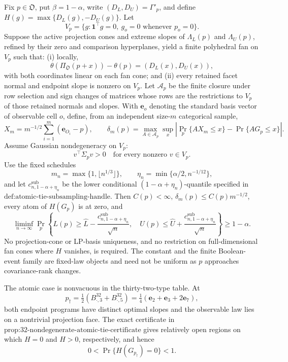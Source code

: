 Fix \(p\in\mathfrak O\), put \(\beta=1-\alpha\), write \((D_L,D_U)=\Gamma'_p\), and define \(H(g)=\max\{D_L(g),-D_U(g)\}\).  Let
\[
V_p=\{g:\mathbf 1^{\top}g=0,\ g_o=0\text{ whenever }p_o=0\}.
\]
Suppose the active projection cones and extreme slopes of \(\Lambda_L(p)\) and \(\Lambda_U(p)\), refined by their zero and comparison hyperplanes, yield a finite polyhedral fan on \(V_p\) such that: (i) locally,
\[
\theta(\Pi_{\mathfrak O}(p+x))-\theta(p)=(D_L(x),D_U(x)),
\]
with both coordinates linear on each fan cone; and (ii) every retained facet normal and endpoint slope is nonzero on \(V_p\).  Let \(\mathcal A_p\) be the finite closure under row selection and sign changes of matrices whose rows are the restrictions to \(V_p\) of those retained normals and slopes.  With \(\mathbf e_o\) denoting the standard basis vector of observable cell \(o\), define, from an independent size-\(m\) categorical sample,
\[
X_m=m^{-1/2}\sum_{i=1}^m(\mathbf e_{O_i}-p),
\qquad
\delta_m(p)=\max_{A\in\mathcal A_p}\sup_x
\left|\Pr_p\{AX_m\leq x\}-\Pr\{AG_p\leq x\}\right|.
\]
Assume Gaussian nondegeneracy on \(V_p\):
\[
v^{\top}\Sigma_pv>0\quad\text{for every nonzero }v\in V_p.
\]
Use the fixed schedules
\[
m_n=\max\{1,\lfloor n^{1/3}\rfloor\},
\qquad
\eta_n=\min\{\alpha/2,n^{-1/12}\},
\]
and let \(c^{\mathrm{sub}}_{n,1-\alpha+\eta_n}\) be the lower conditional \((1-\alpha+\eta_n)\)-quantile specified in \(\text{def:atomic-tie-subsampling-handle}\).  Then \(C(p)<\infty\), \(\delta_m(p)\leq C(p)m^{-1/2}\), every atom of \(H(G_p)\) is at zero, and
\[
\liminf_{n\to\infty}\Pr_p\left\{
L(p)\geq\widehat L-\frac{c^{\mathrm{sub}}_{n,1-\alpha+\eta_n}}{\sqrt n},
\quad
U(p)\leq\widehat U+\frac{c^{\mathrm{sub}}_{n,1-\alpha+\eta_n}}{\sqrt n}
\right\}\geq1-\alpha.
\]
No projection-cone or LP-basis uniqueness, and no restriction on full-dimensional fan cones where \(H\) vanishes, is required.  The constant and the finite Boolean-event family are fixed-law objects and need not be uniform as \(p\) approaches covariance-rank changes.

The atomic case is nonvacuous in the thirty-two-type table.  At
\[
p_\dagger=\tfrac12(B^{32}_{\cdot,3}+B^{32}_{\cdot,5})
=\tfrac14(\mathbf e_2+\mathbf e_3+2\mathbf e_7),
\]
both endpoint programs have distinct optimal slopes and the observable law lies on a nontrivial projection face.  The exact certificate in \(\text{prop:32-nondegenerate-atomic-tie-certificate}\) gives relatively open regions on which \(H=0\) and \(H>0\), respectively, and hence
\[
0<\Pr\{H(G_{p_\dagger})=0\}<1.
\]